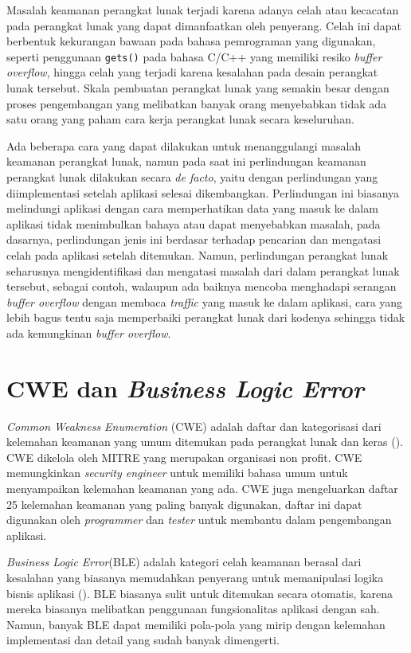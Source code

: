 Masalah keamanan perangkat lunak terjadi karena adanya celah atau kecacatan pada perangkat lunak yang dapat
dimanfaatkan oleh penyerang. Celah ini dapat berbentuk kekurangan bawaan pada bahasa pemrograman yang digunakan,
seperti penggunaan \texttt{gets()} pada bahasa C/C++ yang memiliki resiko \emph{buffer overflow},
hingga celah yang terjadi
karena kesalahan pada desain perangkat lunak tersebut. Skala pembuatan perangkat lunak yang semakin besar
dengan proses pengembangan yang melibatkan banyak orang menyebabkan tidak ada satu orang yang paham
cara kerja perangkat lunak secara keseluruhan.

Ada beberapa cara yang dapat dilakukan untuk menanggulangi masalah keamanan perangkat lunak,
namun pada saat ini perlindungan keamanan perangkat lunak dilakukan secara \emph{de facto},
yaitu dengan perlindungan yang diimplementasi setelah aplikasi selesai dikembangkan.
Perlindungan ini biasanya melindungi aplikasi dengan cara memperhatikan data yang masuk
ke dalam aplikasi tidak menimbulkan bahaya atau dapat menyebabkan masalah, pada dasarnya,
perlindungan jenis ini berdasar terhadap pencarian dan mengatasi celah pada aplikasi setelah ditemukan.
Namun, perlindungan perangkat lunak seharusnya mengidentifikasi dan mengatasi masalah dari
dalam perangkat lunak tersebut, sebagai contoh, walaupun ada baiknya mencoba menghadapi serangan
\emph{buffer overflow} dengan membaca \emph{traffic} yang masuk ke dalam aplikasi,
cara yang lebih bagus tentu saja memperbaiki perangkat lunak dari kodenya sehingga
tidak ada kemungkinan \emph{buffer overflow}.


\section{CWE dan \emph{Business Logic Error}}

\emph{Common Weakness Enumeration} (CWE) adalah daftar dan kategorisasi dari kelemahan keamanan
yang umum ditemukan pada perangkat lunak dan keras (\cite{cwe}). CWE dikelola oleh MITRE
yang merupakan organisasi non profit. CWE memungkinkan \emph{security engineer} untuk memiliki
bahasa umum untuk menyampaikan kelemahan keamanan yang ada. CWE juga mengeluarkan daftar 25
kelemahan keamanan yang paling banyak digunakan, daftar ini dapat digunakan oleh \emph{programmer}
dan \emph{tester} untuk membantu dalam pengembangan aplikasi.

\emph{Business Logic Error}(BLE) adalah kategori celah keamanan berasal dari kesalahan
yang biasanya memudahkan penyerang untuk memanipulasi logika bisnis aplikasi (\cite{ble_cwe}).
BLE biasanya sulit untuk ditemukan secara otomatis, karena mereka biasanya melibatkan
penggunaan fungsionalitas aplikasi dengan sah. Namun, banyak BLE dapat memiliki
pola-pola yang mirip dengan kelemahan implementasi dan detail yang sudah banyak dimengerti.

